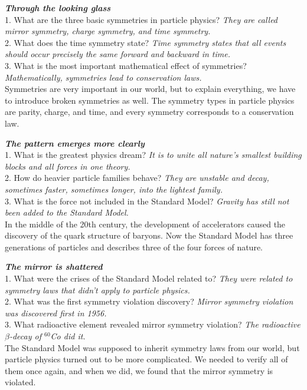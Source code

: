 \documentclass[a4paper, 12pt]{article}
\def\ans#1{\textit{#1}}
\begin{document}
\textbf{\textit{Through the looking glass}}
\\1. What are the three basic symmetries in particle physics? \ans{They are called mirror symmetry, charge symmetry, and time symmetry.}
\\2. What does the time symmetry state? \ans{Time symmetry states that all events should occur precisely the same forward and backward in time.}
\\3. What is the most important mathematical effect of symmetries? \ans{Mathematically, symmetries lead to conservation laws.}
\\ Symmetries are very important in our world, but to explain everything, we have to introduce broken symmetries as well. The symmetry types in particle physics are parity, charge, and time, and every symmetry corresponds to a conservation law.

\textbf{\textit{The pattern emerges more clearly}}
\\1. What is the greatest physics dream? \ans{It is to unite all nature's smallest building blocks and all forces in one theory.}
\\2. How do heavier particle families behave? \ans{They are unstable and decay, sometimes faster, sometimes longer, into the lightest family.}
\\3. What is the force not included in the Standard Model? \ans{Gravity has still not been added to the Standard Model.}
\\ In the middle of the 20th century, the development of accelerators caused the discovery of the quark structure of baryons. Now the Standard Model has three generations of particles and describes three of the four forces of nature.

\textbf{\textit{The mirror is shattered}}
\\1. What were the crises of the Standard Model related to? \ans{They were related to symmetry laws that didn't apply to particle physics.}
\\2. What was the first symmetry violation discovery? \ans{Mirror symmetry violation was discovered first in 1956.}
\\3. What radioactive element revealed mirror symmetry violation? \ans{The radioactive $\beta$-decay of $^{60}$Co did it.}
\\ The Standard Model was supposed to inherit symmetry laws from our world, but particle physics turned out to be more complicated. We needed to verify all of them once again, and when we did, we found that the mirror symmetry is violated.
\end{document}
